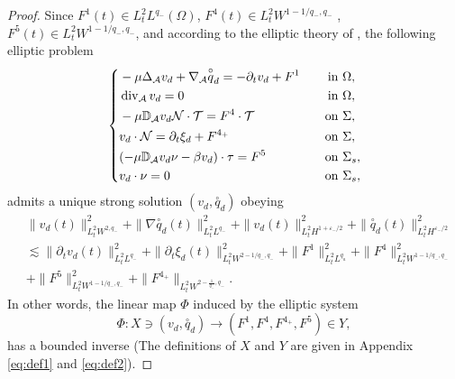 \documentclass[letterpaper,reqno,10pt,twoside]{amsart}
\theoremstyle{definition}
\theoremstyle{remark}
\def\p{\partial}
\def\Om{\Omega}
\def\dive{\mathop{\rm div}\nolimits}
\begin{document}
\begin{proof}
		Since $F^1(t)\in L_{t}^{2}L^{q_-}(\Om)$, $F^{4}(t)\in L_{t}^{2}W^{1-1/q_-, q_-}$ , $F^5(t)\in L_{t}^{2}W^{1-1/q_-, q_-}$, and according to the elliptic theory of \cite[Theorem 4.7]{GT2020}, the following elliptic problem
		\begin{equation}{\label{eq:e2}}
			\left\{
			\begin{aligned}
				&-\mu \Delta_{\mathcal{A}} v_{d} + \nabla_{\mathcal{A}} \overset{\circ}q_{d} = -\p_t v_{d}+ F^1 \quad &\text{in}& \ \Om,\\
				& \dive_{\mathcal{A}} v_{d} = 0 \quad &\text{in}& \ \Om,\\
				& -\mu \mathbb{D}_{\mathcal{A}} v_{d}\mathcal{N} \cdot \mathcal{T} = F^{4} \cdot \mathcal{T} \quad &\text{on}& \ \Sigma,\\
				& v_{d}\cdot \mathcal{N} = \p_t\xi_{d}+F^{4_{+}} \quad &\text{on}& \ \Sigma,\\
				&(-\mu \mathbb{D}_{\mathcal{A}} v_{d} \nu - \beta v_{d} ) \cdot \tau =F^{5} \quad &\text{on}& \ \Sigma_s,\\
				& v_{d} \cdot \nu =0 \quad &\text{on}& \ \Sigma_s,
			\end{aligned}
			\right.
		\end{equation}
		admits a unique strong solution $(v_{d}, \overset{\circ}q_{d})$ obeying
		\begin{equation}\label{est:bound_vq}
			\begin{aligned}
				&\|v_{d}(t)\|_{L_{t}^{2}W^{2,q_-}}^2+\|\nabla \overset{\circ}q_{d}(t)\|_{L_{t}^{2}L^{q_-}}^2 + \|v_{d}(t)\|_{L_{t}^{2}H^{1+\varepsilon_-/2}}^2 + \|\overset{\circ}q_{d}(t)\|_{L_{t}^{2}H^{\varepsilon_-/2}}^2\\
				&\lesssim \|\p_tv_{d}(t)\|_{L_{t}^{2}L^{q_-}}^2 +\|\p_t\xi_{d}(t)\|_{L_{t}^{2}W^{2-1/q_-,q_-}}^2+\|F^1\|_{L_{t}^{2}L^{q_a}}^2+\|F^{4}\|_{L_{t}^{2}W^{1-1/q_-,q_-}}^2\\
				& +\|F^5\|_{L_{t}^{2}W^{1-1/q_-,q_-}}^2+\|F^{4_{+}}\|_{L_{t}^{2}W^{2-\frac{1}{q_{-}},q_{-}}}.
			\end{aligned}
		\end{equation}
		\noindent In other words, the linear map $\Phi$ induced by the elliptic system 
		\[
		\Phi: X\ni(v_d,\overset{\circ}q_d)\rightarrow (F^{1},F^{4},F^{4_{+}},F^{5})\in Y,
		\]
		has a bounded inverse (The definitions of $X$ and $Y$ are given in Appendix \eqref{eq:def1} and \eqref{eq:def2}).
		

\end{proof}
\end{document}
